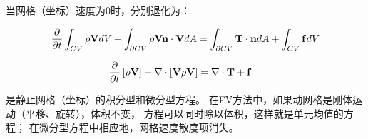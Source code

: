 \documentclass[UTF8,zihao=5]{ctexart} %
\newcommand{\bm}[1]{{\mathbf{#1}}}
\newcommand*{\pd}[2]{\frac{\partial #1}{\partial #2}}
\begin{document}
当网格（坐标）速度为0时，分别退化为：

\begin{equation}
    \pd{}{t}\int_{CV}{
        \rho\V dV
    }
    +
    \int_{\partial CV}{
        \rho\V \nn \cdot \V dA
    }
    =
    \int_{\partial CV}{\bm{T}\cdot\nn dA} +
    \int_{CV}{\bm{f} dV}
\end{equation}

\begin{equation}
    \begin{aligned}
        \pd{}{t}\left[\rho\V\right]
        &
        +
        \nabla\cdot\left[\V\rho\V\right]
        =
        \nabla\cdot\bm{T}
        +
        \bm{f}
    \end{aligned}
\end{equation}

是静止网格（坐标）的积分型和微分型方程。
在FV方法中，如果动网格是刚体运动（平移、旋转），体积不变，
方程可以同时除以体积，这样就是单元均值的方程；
在微分型方程中相应地，网格速度散度项消失。






 











































\end{document}
